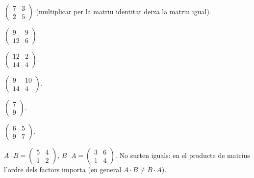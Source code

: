 \begin{solucions}
\begin{sollist}
  \item $\begin{pmatrix} 7 & 3 \\ 2 & 5 \end{pmatrix}$ (multiplicar per la matriu
        identitat deixa la matriu igual).
  \item $\begin{pmatrix} 9 & 9 \\ 12 & 6 \end{pmatrix}$.
  \item $\begin{pmatrix} 12 & 2 \\ 14 & 4 \end{pmatrix}$.
  \item $\begin{pmatrix} 9 & 10 \\ 14 & 4 \end{pmatrix}$.
  \item $\begin{pmatrix} 7 \\ 9 \end{pmatrix}$.
  \item $\begin{pmatrix} 6 & 5 \\ 9 & 7 \end{pmatrix}$.
  \item $A\cdot B=\begin{pmatrix} 5 & 4 \\ 1 & 2 \end{pmatrix}$,
        \;$B\cdot A=\begin{pmatrix} 3 & 6 \\ 1 & 4 \end{pmatrix}$. No surten iguals:
        en el producte de matrius l'ordre dels factors importa (en general
        $A\cdot B\neq B\cdot A$).
\end{sollist}
\end{solucions}
